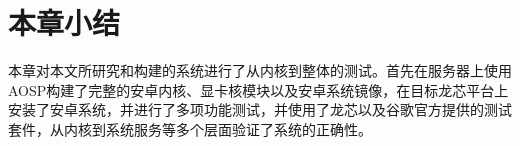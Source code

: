 



\section{本章小结}
本章对本文所研究和构建的系统进行了从内核到整体的测试。首先在服务器上使用AOSP构建了完整的安卓内核、显卡核模块以及安卓系统镜像，在目标龙芯平台上
安装了安卓系统，并进行了多项功能测试，并使用了龙芯以及谷歌官方提供的测试套件，从内核到系统服务等多个层面验证了系统的正确性。